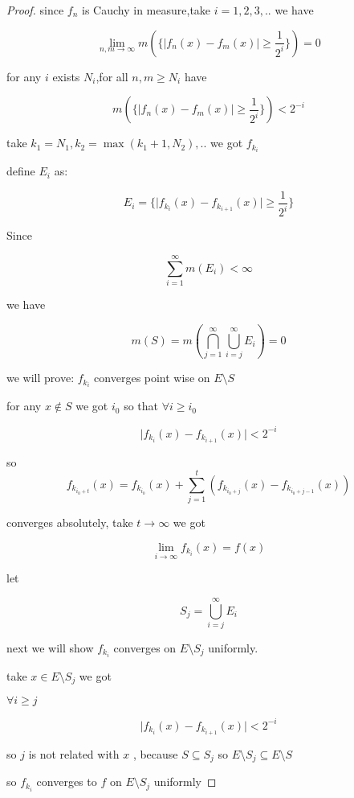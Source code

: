 \documentclass[11pt,a4paper]{article}
\begin{document}
\begin{proof}
    since $f_n$ is Cauchy in measure,take $i=1,2,3,..$ we have

    \[
        \lim_{n,m \to \infty} m(\{ \lvert f_n(x) - f_m(x)\rvert \ge \frac{1}{2^i} \}) = 0
    \]

    for any $i$ exists $N_i$,for all $n,m \ge N_i$ have

    \[
        m(\{ \lvert f_n(x) - f_m(x)\rvert \ge \frac{1}{2^i} \}) < 2^{-i}
    \]

    take $k_1 = N_1, k_2 = \max(k_1 + 1, N_2), ..$ we got $f_{k_i}$

    define $E_i$ as:

    \[
        E_i = \{ \lvert f_{k_i}(x) - f_{k_{i+1}}(x)\rvert \ge \frac{1}{2^i} \}
    \]

    Since

    \[
        \sum_{i=1}^{\infty}m(E_i) < \infty
    \]

    we have

    \[
        m(S) = m(\bigcap_{j=1}^{\infty}\bigcup_{i=j}^{\infty}E_i) = 0
    \]

    we will prove: $f_{k_i}$ converges point wise on $E \setminus S$ 
    
    for any $x \notin S$ we got $i_0$ so that $\forall i \ge i_0$

    \[
        \lvert f_{k_{i}}(x) - f_{k_{i+1}}(x) \rvert < 2^{-i}
    \]

    so
    \[
    f_{k_{i_0 + t}}(x) = f_{k_{i_0}}(x) + \sum_{j=1}^{t}\left( f_{k_{i_0+j}}(x) - f_{k_{i_0+j-1}}(x) \right)
    \]

    converges absolutely, take $t \to \infty$ we got

    \[
        \lim_{i \to \infty}f_{k_i}(x) = f(x)
    \]

    let

    \[
        S_j = \bigcup_{i=j}^{\infty}E_i
    \]

    next we will show $f_{k_i}$ converges on $E \setminus S_j$ uniformly.
    
    take $x \in E \setminus S_j$ we got

    $\forall i \ge j$

    \[
        \lvert f_{k_i}(x) - f_{k_{i+1}}(x) \rvert < 2^{-i}
    \]

    so $j$ is not related with $x$ , because $S \subseteq S_j$ so $ E \setminus S_j \subseteq E \setminus S $ 

    so $f_{k_i}$ converges to $f$ on $E \setminus S_j$ uniformly


\end{proof}
\end{document}
